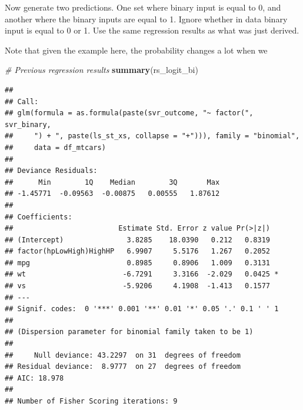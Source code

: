 \documentclass[
]{book}
\newenvironment{Shaded}{\begin{snugshade}}{\end{snugshade}}
\newcommand{\CommentTok}[1]{\textcolor[rgb]{0.56,0.35,0.01}{\textit{#1}}}
\newcommand{\KeywordTok}[1]{\textcolor[rgb]{0.13,0.29,0.53}{\textbf{#1}}}
\newcommand{\NormalTok}[1]{#1}
\begin{document}
Now generate two predictions. One set where binary input is equal to 0, and another where the binary inputs are equal to 1. Ignore whether in data binary input is equal to 0 or 1. Use the same regression results as what was just derived.

Note that given the example here, the probability changes a lot when we

\begin{Shaded}
\begin{Highlighting}[]
\CommentTok{# Previous regression results}
\KeywordTok{summary}\NormalTok{(rs_logit_bi)}
\end{Highlighting}
\end{Shaded}

\begin{verbatim}
## 
## Call:
## glm(formula = as.formula(paste(svr_outcome, "~ factor(", svr_binary, 
##     ") + ", paste(ls_st_xs, collapse = "+"))), family = "binomial", 
##     data = df_mtcars)
## 
## Deviance Residuals: 
##      Min        1Q    Median        3Q       Max  
## -1.45771  -0.09563  -0.00875   0.00555   1.87612  
## 
## Coefficients:
##                         Estimate Std. Error z value Pr(>|z|)  
## (Intercept)               3.8285    18.0390   0.212   0.8319  
## factor(hpLowHigh)HighHP   6.9907     5.5176   1.267   0.2052  
## mpg                       0.8985     0.8906   1.009   0.3131  
## wt                       -6.7291     3.3166  -2.029   0.0425 *
## vs                       -5.9206     4.1908  -1.413   0.1577  
## ---
## Signif. codes:  0 '***' 0.001 '**' 0.01 '*' 0.05 '.' 0.1 ' ' 1
## 
## (Dispersion parameter for binomial family taken to be 1)
## 
##     Null deviance: 43.2297  on 31  degrees of freedom
## Residual deviance:  8.9777  on 27  degrees of freedom
## AIC: 18.978
## 
## Number of Fisher Scoring iterations: 9
\end{verbatim}
\end{document}

